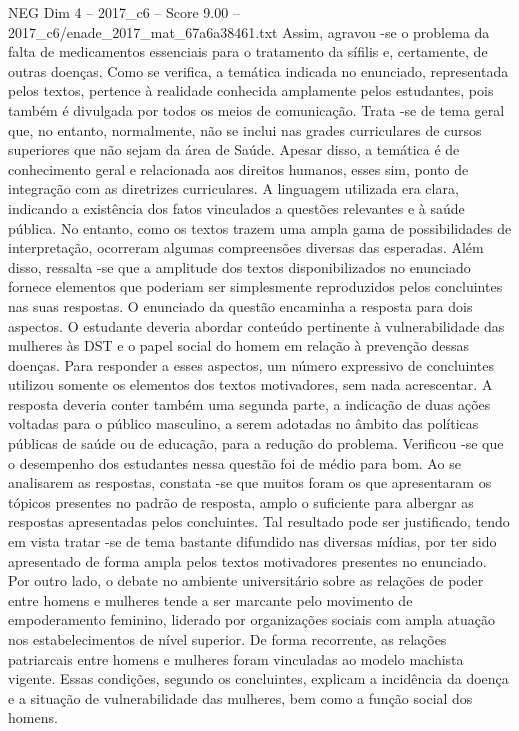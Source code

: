 \begin{textsample}{NEG Dim 4 – 2017\_c6 – Score 9.00 – 2017\_c6/enade\_2017\_mat\_67a6a38461.txt}
Assim, agravou -se o problema da falta de medicamentos essenciais para o tratamento da sífilis e, certamente, de outras doenças.
Como se verifica, a temática indicada no enunciado, representada pelos textos, pertence à realidade conhecida amplamente pelos estudantes, pois também é divulgada por todos os meios de comunicação.
Trata -se de tema geral que, no entanto, normalmente, não se inclui nas grades curriculares de cursos superiores que não sejam da área de Saúde.
Apesar disso, a temática é de conhecimento geral e relacionada aos direitos humanos, esses sim, ponto de integração com as diretrizes curriculares.
A linguagem utilizada era clara, indicando a existência dos fatos vinculados a questões relevantes e à saúde pública.
No entanto, como os textos trazem uma ampla gama de possibilidades de interpretação, ocorreram algumas compreensões diversas das esperadas.
Além disso, ressalta -se que a amplitude dos textos disponibilizados no enunciado fornece elementos que poderiam ser simplesmente reproduzidos pelos concluintes nas suas respostas.
O enunciado da questão encaminha a resposta para dois aspectos.
O estudante deveria abordar conteúdo pertinente à vulnerabilidade das mulheres às DST e o papel social do homem em relação à prevenção dessas doenças.
Para responder a esses aspectos, um número expressivo de concluintes utilizou somente os elementos dos textos motivadores, sem nada acrescentar.
A resposta deveria conter também uma segunda parte, a indicação de duas ações voltadas para o público masculino, a serem adotadas no âmbito das políticas públicas de saúde ou de educação, para a redução do problema.
Verificou -se que o desempenho dos estudantes nessa questão foi de médio para bom.
Ao se analisarem as respostas, constata -se que muitos foram os que apresentaram os tópicos presentes no padrão de resposta, amplo o suficiente para albergar as respostas apresentadas pelos concluintes.
Tal resultado pode ser justificado, tendo em vista tratar -se de tema bastante difundido nas diversas mídias, por ter sido apresentado de forma ampla pelos textos motivadores presentes no enunciado.
Por outro lado, o debate no ambiente universitário sobre as relações de poder entre homens e mulheres tende a ser marcante pelo movimento de empoderamento feminino, liderado por organizações sociais com ampla atuação nos estabelecimentos de nível superior.
De forma recorrente, as relações patriarcais entre homens e mulheres foram vinculadas ao modelo machista vigente.
Essas condições, segundo os concluintes, explicam a incidência da doença e a situação de vulnerabilidade das mulheres, bem como a função social dos homens.

\end{textsample}
